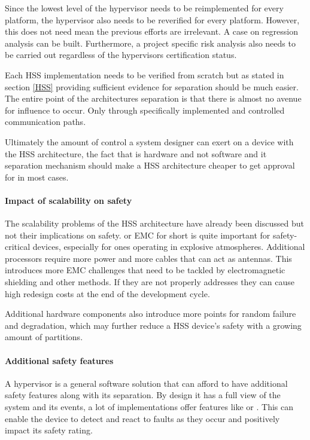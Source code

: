 Since the lowest level of the hypervisor needs to be reimplemented for every platform, the hypervisor also needs to be reverified for every platform. However, this does not need mean the previous efforts are irrelevant. A case on regression analysis can be built.
Furthermore, a project specific risk analysis also needs to be carried out regardless of the hypervisors certification status.

Each \gls{HSS} implementation needs to be verified from scratch but as stated in section \ref{HSS} providing sufficient evidence for separation should be much easier. The entire point of the architectures separation is that there is almost no avenue for influence to occur. Only through specifically implemented and controlled communication paths.

Ultimately the amount of control a system designer can exert on a device with the \gls{HSS} architecture, the fact that is hardware and not software and it separation mechanism should make a \gls{HSS} architecture cheaper to get approval for in most cases.


\paragraph{Impact of scalability on safety}
The scalability problems of the \gls{HSS} architecture have already been discussed but not their implications on safety.  or \gls{EMC} for short is quite important for safety-critical devices, especially for ones operating in explosive atmospheres. Additional processors require more power and more cables that can act as antennas. This introduces more \gls{EMC} challenges that need to be tackled by electromagnetic shielding and other methods. If they are not properly addresses they can cause high redesign costs at the end of the development cycle.

Additional hardware components also introduce more points for random failure and degradation, which may further reduce a \gls{HSS} device's safety with a growing amount of partitions.

\paragraph{Additional safety features}
A hypervisor is a general software solution that can afford to have additional safety features along with its separation. By design it has a full view of the system and its events, a lot of implementations offer features like  or . This can enable the device to detect and react to faults as they occur and positively impact its safety rating.

